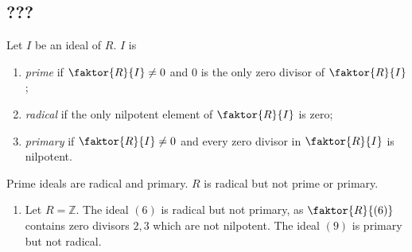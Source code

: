 \subsection{???}
\begin{definition}
    Let \( I \) be an ideal of \( R \).
    \( I \) is
    \begin{enumerate}
        \item \emph{prime} if \( \faktor{R}{I} \neq 0 \) and \( 0 \) is the only zero divisor of \( \faktor{R}{I} \);
        \item \emph{radical} if the only nilpotent element of \( \faktor{R}{I} \) is zero;
        \item \emph{primary} if \( \faktor{R}{I} \neq 0 \) and every zero divisor in \( \faktor{R}{I} \) is nilpotent.
    \end{enumerate}
\end{definition}
Prime ideals are radical and primary.
\( R \) is radical but not prime or primary.
\begin{example}
    \begin{enumerate}
        \item Let \( R = \mathbb Z \).
        The ideal \( (6) \) is radical but not primary, as \( \faktor{R}{(6)} \) contains zero divisors \( 2, 3 \) which are not nilpotent.
        The ideal \( (9) \) is primary but not radical.
    \end{enumerate}
\end{example}
